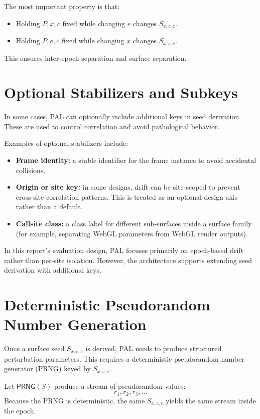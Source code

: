 \documentclass[11pt]{report}
\begin{document}
The most important property is that:
\begin{itemize}
    \item Holding $P, x, c$ fixed while changing $e$ changes $S_{x,c,e}$.
    \item Holding $P, e, c$ fixed while changing $x$ changes $S_{x,c,e}$.
\end{itemize}

This ensures inter-epoch separation and surface separation.

\section{Optional Stabilizers and Subkeys}

In some cases, PAL can optionally include additional keys in seed derivation. These are used to control correlation and avoid pathological behavior.

Examples of optional stabilizers include:
\begin{itemize}
    \item \textbf{Frame identity:} a stable identifier for the frame instance to avoid accidental collisions.
    \item \textbf{Origin or site key:} in some designs, drift can be site-scoped to prevent cross-site correlation patterns. This is treated as an optional design axis rather than a default.
    \item \textbf{Callsite class:} a class label for different sub-surfaces inside a surface family (for example, separating WebGL parameters from WebGL render outputs).
\end{itemize}

In this report’s evaluation design, PAL focuses primarily on epoch-based drift rather than per-site isolation. However, the architecture supports extending seed derivation with additional keys.

\section{Deterministic Pseudorandom Number Generation}

Once a surface seed $S_{x,c,e}$ is derived, PAL needs to produce structured perturbation parameters. This requires a deterministic pseudorandom number generator (PRNG) keyed by $S_{x,c,e}$.

Let $\mathsf{PRNG}(S)$ produce a stream of pseudorandom values:
\[
r_1, r_2, r_3, \dots
\]
Because the PRNG is deterministic, the same $S_{x,c,e}$ yields the same stream inside the epoch.
\end{document}
